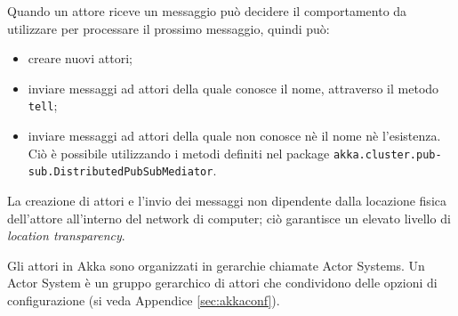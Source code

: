 Quando un attore riceve un messaggio può decidere il comportamento
da utilizzare per processare il prossimo messaggio, quindi può:
\begin{itemize}
	\item creare nuovi attori;
	\item inviare messaggi ad attori della quale conosce il nome, attraverso il metodo \texttt{tell};
	\item inviare messaggi ad attori della quale non conosce nè il nome nè l'esistenza.
	Ciò è possibile utilizzando i metodi definiti nel package \texttt{akka.cluster.pub- sub.DistributedPubSubMediator}.
\end{itemize}
La creazione di attori e l'invio dei messaggi non dipendente dalla
locazione fisica dell'attore all'interno del network di computer;
ciò garantisce un elevato livello di \emph{location transparency}.

Gli attori in Akka sono organizzati in gerarchie chiamate Actor Systems.
Un Actor System è un gruppo gerarchico di attori che condividono delle
opzioni di configurazione (si veda Appendice \ref{sec:akkaconf}).

